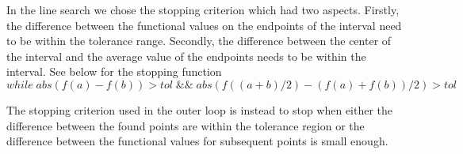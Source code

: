 In the line search we chose the stopping criterion which had two aspects. Firstly, the difference between the functional values on the endpoints of the interval need to be within the tolerance range. Secondly, the difference between the center of the interval and the average value of the endpoints needs to be within the interval. See below for the stopping function
$$ while\; abs(f(a)-f(b)) > tol\; \&\&\;abs(f((a+b)/2)-(f(a)+f(b))/2) > tol$$

The stopping criterion used in the outer loop is instead to stop when either the difference between the found points are within the tolerance region or the difference between the functional values for subsequent points is small enough.